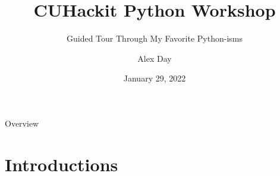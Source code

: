 \documentclass[aspectratio=169,xcolor=dvipsnames]{beamer}
\title[short title]{CUHackit Python Workshop} %
\subtitle{Guided Tour Through My Favorite Python-isms}
\author[Day]{Alex Day}
\institute[CU] %
{
  Ph.D. Student\\
  School of Computing\\
  \vspace{5px}
  \href{https://github.com/AlexanderDavid/CUHackit2022-PythonWorkshop}{shorturl.at/lrFH2}
}
\date{January 29, 2022} %
\begin{document}
\begin{frame}
    \titlepage
\end{frame}

\begin{frame}{Overview}
    \tableofcontents
\end{frame}

\section{Introductions}
\end{document}
